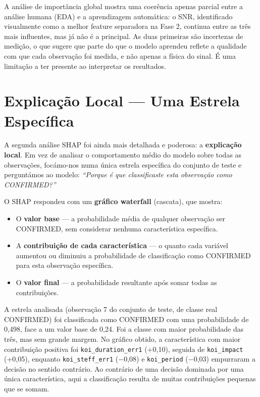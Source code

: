 \documentclass[12pt, a4paper]{report}
\begin{document}
\begin{caixaresultado}
A análise de importância global mostra uma coerência apenas parcial entre a análise humana (EDA) e a aprendizagem automática: o SNR, identificado visualmente como a melhor feature separadora na Fase 2, continua entre as três mais influentes, mas já não é a principal. As duas primeiras são incertezas de medição, o que sugere que parte do que o modelo aprendeu reflete a qualidade com que cada observação foi medida, e não apenas a física do sinal. É uma limitação a ter presente ao interpretar os resultados.
\end{caixaresultado}

\section{Explicação Local — Uma Estrela Específica}

A segunda análise SHAP foi ainda mais detalhada e poderosa: a \textbf{explicação local}. Em vez de analisar o comportamento médio do modelo sobre todas as observações, focámo-nos numa única estrela específica do conjunto de teste e perguntámos ao modelo: \textit{``Porque é que classificaste esta observação como CONFIRMED?''}

O SHAP respondeu com um \textbf{gráfico waterfall} (cascata), que mostra:

\begin{itemize}
    \item O \textbf{valor base} — a probabilidade média de qualquer observação ser CONFIRMED, sem considerar nenhuma característica específica.
    \item A \textbf{contribuição de cada característica} — o quanto cada variável aumentou ou diminuiu a probabilidade de classificação como CONFIRMED para esta observação específica.
    \item O \textbf{valor final} — a probabilidade resultante após somar todas as contribuições.
\end{itemize}

A estrela analisada (observação 7 do conjunto de teste, de classe real CONFIRMED) foi classificada como CONFIRMED com uma probabilidade de 0,498, face a um valor base de 0,24. Foi a classe com maior probabilidade das três, mas sem grande margem. No gráfico obtido, a característica com maior contribuição positiva foi \texttt{koi\_duration\_err1} (+0,10), seguida de \texttt{koi\_impact} (+0,05), enquanto \texttt{koi\_steff\_err1} ($-$0,08) e \texttt{koi\_period} ($-$0,03) empurraram a decisão no sentido contrário. Ao contrário de uma decisão dominada por uma única característica, aqui a classificação resulta de muitas contribuições pequenas que se somam.
\end{document}
